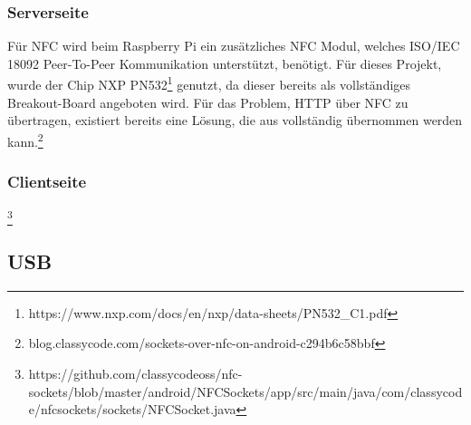     \subsubsection{Serverseite}
	    Für NFC wird beim Raspberry Pi ein zusätzliches NFC Modul, welches ISO/IEC 18092 Peer-To-Peer Kommunikation unterstützt, benötigt. Für dieses Projekt, wurde der Chip NXP PN532\footnote{https://www.nxp.com/docs/en/nxp/data-sheets/PN532_C1.pdf} genutzt, da dieser bereits als vollständiges Breakout-Board angeboten wird. Für das Problem, HTTP über NFC zu übertragen, existiert bereits eine Lösung, die aus \cite{nfcSockets} vollständig übernommen werden kann.\footnote{blog.classycode.com/sockets-over-nfc-on-android-c294b6c58bbf}
	\subsubsection{Clientseite}
	    \footnote{https://github.com/classycodeoss/nfc-sockets/blob/master/android/NFCSockets/app/src/main/java/com/classycode/nfcsockets/sockets/NFCSocket.java}
    \subsection{USB}
